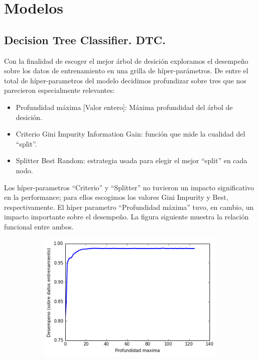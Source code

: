 \documentclass[a4paper,10pt]{article}
\begin{document}
\section{Modelos}

\subsection{Decision Tree Classifier. DTC.}

\par Con la finalidad de escoger el mejor árbol de desición exploramos 
el desempeño sobre los datos de entrenamiento en una grilla de híper-parámetros.
De entre el total de híper-parametros del modelo decidimos profundizar sobre 
tres que nos parecieron especialmente relevantes:
\begin{itemize}
 \item Profundidad máxima [Valor entero]: Máxima profundidad del árbol de desición. 
 \item Criterio Gini Impurity  Information Gain: función que mide la cualidad 
del ``split''. 
  \item Splitter Best  Random: estrategia usada para elegir el mejor 
``split'' en cada nodo.
\end{itemize}

Los híper-parametros ``Criterio'' y ``Splitter'' no tuvieron un impacto 
significativo en la performance; para ellos escogimos los valores Gini Impurity 
y Best, respectivamente.
El híper parametro ``Profundidad máxima'' tuvo, en cambio, un impacto 
importante sobre el desempeño. La figura siguiente muestra 
la relación funcional entre ambos.

  \begin{figure}[H]
    \centering
    \begin{subfigure}[b]{0.4\textwidth}
      \includegraphics[width=\textwidth]{../imagenes/desempeno-profundiad_arboles}
      \caption{}
    \end{subfigure}
    \label{fig:autovalores}
  \end{figure}
\end{document}
